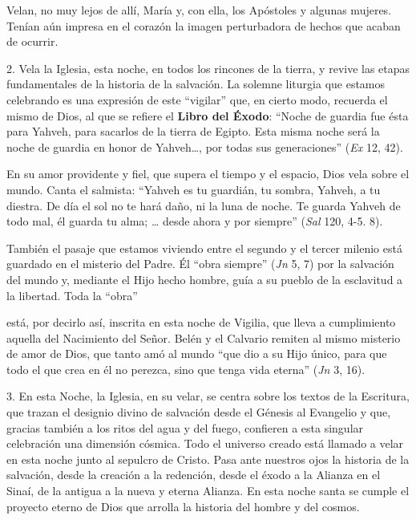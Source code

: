 			\begin{body}Velan, no muy lejos de allí, María y, con ella, los Apóstoles y algunas mujeres. Tenían aún impresa en el corazón la imagen perturbadora de hechos que acaban de ocurrir.\end{body}
			
			\begin{body}2. Vela la Iglesia, esta noche, en todos los rincones de la tierra, y revive las etapas fundamentales de la historia de la salvación. La solemne liturgia que estamos celebrando es una expresión de este “vigilar” que, en cierto modo, recuerda el mismo de Dios, al que se refiere el \textbf{Libro del Éxodo}: “Noche de guardia fue ésta para Yahveh, para sacarlos de la tierra de Egipto. Esta misma noche será la noche de guardia en honor de Yahveh…, por todas sus generaciones” (\textit{Ex} 12, 42).\end{body}
			
			\begin{body}En su amor providente y fiel, que supera el tiempo y el espacio, Dios vela sobre el mundo. Canta el salmista: “Yahveh es tu guardián, tu sombra, Yahveh, a tu diestra. De día el sol no te hará daño, ni la luna de noche. Te guarda Yahveh de todo mal, él guarda tu alma; … desde ahora y por siempre” (\textit{Sal} 120, 4-5. 8).\end{body}
			
			\begin{body}También el pasaje que estamos viviendo entre el segundo y el tercer milenio está guardado en el misterio del Padre. Él “obra siempre” (\textit{Jn} 5, 7) por la salvación del mundo y, mediante el Hijo hecho hombre, guía a su pueblo de la esclavitud a la libertad. Toda la “obra” \begin{bodysmall}\end{bodysmall} está, por decirlo así, inscrita en esta noche de Vigilia, que lleva a cumplimiento aquella del Nacimiento del Señor. Belén y el Calvario remiten al mismo misterio de amor de Dios, que tanto amó al mundo “que dio a su Hijo único, para que todo el que crea en él no perezca, sino que tenga vida eterna” (\textit{Jn} 3, 16).\end{body}
			
			\begin{body}3. En esta Noche, la Iglesia, en su velar, se centra sobre los textos de la Escritura, que trazan el designio divino de salvación desde el Génesis al Evangelio y que, gracias también a los ritos del agua y del fuego, confieren a esta singular celebración una dimensión cósmica. Todo el universo creado está llamado a velar en esta noche junto al sepulcro de Cristo. Pasa ante nuestros ojos la historia de la salvación, desde la creación a la redención, desde el éxodo a la Alianza en el Sinaí, de la antigua a la nueva y eterna Alianza. En esta noche santa se cumple el proyecto eterno de Dios que arrolla la historia del hombre y del cosmos.\end{body}
			
